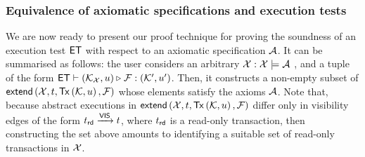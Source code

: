 \subsubsection{Equivalence of axiomatic specifications and execution tests}
We are now ready to present our proof technique for proving the soundness 
of an execution test $\mathsf{ET}$ with respect to an axiomatic specification $\mathcal{A}$.
It can be summarised as follows: 
the user considers an arbitrary 
$\mathcal{X}: \mathcal{X} \models \mathcal{A}$ , and a tuple of the form 
$\mathsf{ET} \vdash (\mathcal{K}_{\mathcal{X}}, u) \triangleright_{} \mathcal{F}: (\mathcal{K}', u')$. 
Then, it constructs a non-empty subset of $\extend[\aexec, \txid, \Tx[\hh, \vi], \fp]$ 
whose elements satisfy the axioms $\mathcal{A}$. Note that, because abstract executions in
$\extend[\aexec, \txid, \Tx[\hh, \vi], \fp]$ differ only in visibility edges of the form $t_{\mathsf{rd}}
\xrightarrow{\mathsf{VIS}} t$, where $t_{\mathsf{rd}}$ is a read-only transaction, 
then constructing the set above amounts to identifying a suitable set of 
read-only transactions in $\mathcal{X}$.
%

